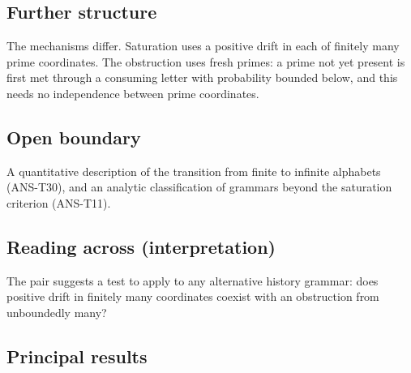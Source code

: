 \documentclass[
  11pt,
]{article}
\begin{document}
\hypertarget{further-structure-1}{%
\subsection{Further structure}\label{further-structure-1}}

The mechanisms differ. Saturation uses a positive drift in each of
finitely many prime coordinates. The obstruction uses fresh primes: a
prime not yet present is first met through a consuming letter with
probability bounded below, and this needs no independence between prime
coordinates.

\hypertarget{open-boundary-1}{%
\subsection{Open boundary}\label{open-boundary-1}}

A quantitative description of the transition from finite to infinite
alphabets (ANS-T30), and an analytic classification of grammars beyond
the saturation criterion (ANS-T11).

\hypertarget{reading-across-interpretation-1}{%
\subsection{Reading across
(interpretation)}\label{reading-across-interpretation-1}}

The pair suggests a test to apply to any alternative history grammar:
does positive drift in finitely many coordinates coexist with an
obstruction from unboundedly many?

\hypertarget{principal-results-1}{%
\subsection{Principal results}\label{principal-results-1}}
\end{document}
